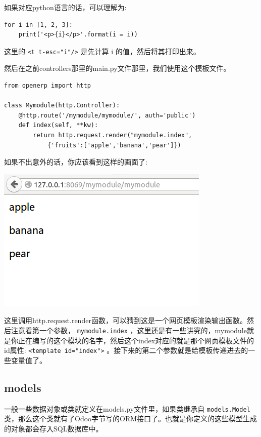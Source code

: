 \documentclass[11pt,a4paper]{sphinxmanual}
\begin{document}
如果对应python语言的话，可以理解为:
\begin{verbatim}
for i in [1, 2, 3]:
    print('<p>{i}</p>'.format(i = i))
\end{verbatim}

这里的 \verb~<t t-esc="i"/>~ 是先计算 i 的值，然后将其打印出来。


然后在之前controllers那里的main.py文件那里，我们使用这个模板文件。
\begin{verbatim}
from openerp import http

class Mymodule(http.Controller):
    @http.route('/mymodule/mymodule/', auth='public')
    def index(self, **kw):
        return http.request.render("mymodule.index",
            {'fruits':['apple','banana','pear']})
\end{verbatim}

如果不出意外的话，你应该看到这样的画面了:

\includegraphics[keepaspectratio,max width=0.95\linewidth]{images/mymodule_index.png}

这里调用http.request.render函数，可以猜到这是一个网页模板渲染输出函数。然后注意看第一个参数， \verb~mymodule.index~ ，这里还是有一些讲究的，mymodule就是你正在编写的这个模块的名字，然后这个index对应的就是那个网页模板文件的id属性: \verb~<template id="index">~ 。接下来的第二个参数就是给模板传递进去的一些变量值了。


\subsection{models}
\label{sec-5-3-3}
一般一些数据对象或类就定义在models.py文件里，如果类继承自 \verb~models.Model~ 类，那么这个类就有了Odoo字节写的ORM接口了。也就是你定义的这些模型生成的对象都会存入SQL数据库中。
\end{document}
